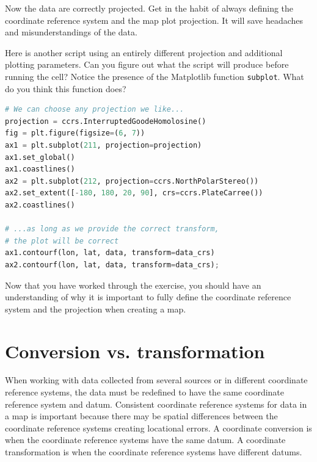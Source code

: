 \documentclass[a4paper , 12pt]{book}
\newcommand{\code}[1]{\colorbox{light-gray}{\texttt{#1}}}
\begin{document}
Now the data are correctly projected. Get in the habit of always defining the coordinate reference system and the map plot projection. It will save headaches and misunderstandings of the data.

Here is another script using an entirely different projection and additional plotting parameters. Can you figure out what the script will produce before running the cell? Notice the presence of the Matplotlib function \code{subplot}. What do you think this function does?

\begin{center}
\begin{lstlisting}[language=Python, frame=single]
# We can choose any projection we like...
projection = ccrs.InterruptedGoodeHomolosine()
fig = plt.figure(figsize=(6, 7))
ax1 = plt.subplot(211, projection=projection)
ax1.set_global()
ax1.coastlines()
ax2 = plt.subplot(212, projection=ccrs.NorthPolarStereo())
ax2.set_extent([-180, 180, 20, 90], crs=ccrs.PlateCarree())
ax2.coastlines()

# ...as long as we provide the correct transform, 
# the plot will be correct
ax1.contourf(lon, lat, data, transform=data_crs)
ax2.contourf(lon, lat, data, transform=data_crs);
\end{lstlisting}
\end{center}

Now that you have worked through the exercise, you should have an understanding of why it is important to fully define the coordinate reference system and the projection when creating a map.

\section{Conversion vs. transformation}

When working with data collected from several sources or in different coordinate reference systems, the data must be redefined to have the same coordinate reference system and datum. Consistent coordinate reference systems for data in a map is important because there may be spatial differences between the coordinate reference systems creating locational errors. A coordinate conversion is when the coordinate reference systems have the same datum. A coordinate transformation is when the coordinate reference systems have different datums.
\end{document}
